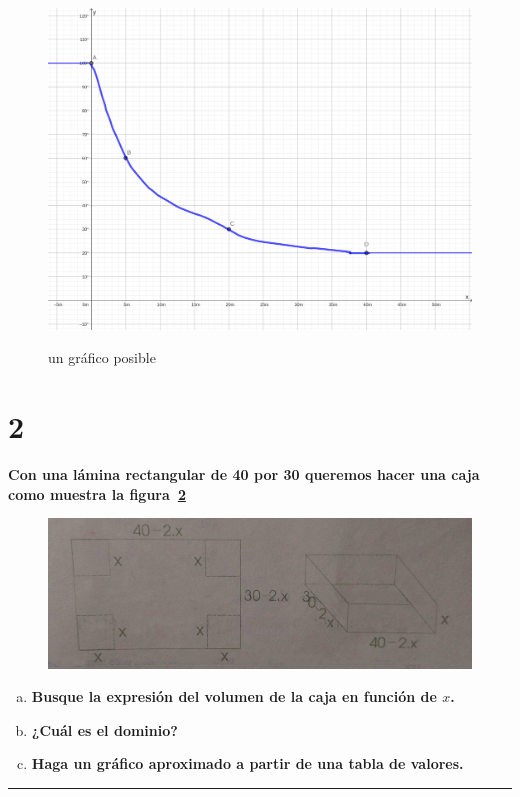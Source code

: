 \documentclass{article}
\begin{document}
\newpage

\begin{figure}[ht]
\caption{un gráfico posible}
\includegraphics[scale=0.17]{../img/guide_01/ex_01.png} 
\centering
\label{fig:1}
\end{figure}

\section*{2}
\label{sec:2}

\textbf{Con una lámina rectangular de 40 por 30 queremos hacer una caja como muestra la figura~\ref{fig:2}}

\begin{figure}[ht]
\caption{}
\includegraphics[scale=0.8]{../img/guide_01/ex_02.png} 
\centering
\label{fig:2}
\end{figure}

\begin{enumerate}[(a)]

\item \textbf{Busque la expresión del volumen de la caja en función de $x$. }

\item \textbf{¿Cuál es el dominio?}

\item \textbf{Haga un gráfico aproximado a partir de una tabla de valores.}

\end{enumerate}
\hrule
\end{document}

